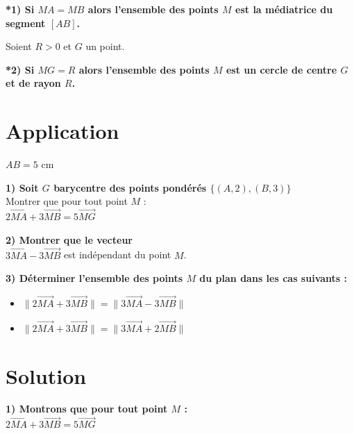 \documentclass{article}
\begin{document}
\noindent \textbf{*1) Si $MA = MB$ alors l'ensemble des points $M$ est la médiatrice du segment $[AB]$.}

\vspace{1.5em}

\noindent Soient $R > 0$ et $G$ un point.

\vspace{1em}

\noindent \textbf{*2) Si $MG = R$ alors l'ensemble des points $M$ est un cercle de centre $G$ et de rayon $R$.}

\section*{Application}

\noindent $AB = 5\text{ cm}$

\vspace{1em}

\noindent \textbf{1) Soit $G$ barycentre des points pondérés $\{(A, 2), (B, 3)\}$} \\
Montrer que pour tout point $M$ : \\
$2 \overrightarrow{MA} + 3 \overrightarrow{MB} = 5 \overrightarrow{MG}$

\vspace{1.5em}

\noindent \textbf{2) Montrer que le vecteur} \\
$3 \overrightarrow{MA} - 3 \overrightarrow{MB}$ est indépendant du point $M$.

\vspace{1.5em}

\noindent \textbf{3) Déterminer l'ensemble des points $M$ du plan dans les cas suivants :}

\vspace{1em}

\begin{itemize}
    \item[a)] $\| 2 \overrightarrow{MA} + 3 \overrightarrow{MB} \| = \| 3 \overrightarrow{MA} - 3 \overrightarrow{MB} \|$
    \item[b)] $\| 2 \overrightarrow{MA} + 3 \overrightarrow{MB} \| = \| 3 \overrightarrow{MA} + 2 \overrightarrow{MB} \|$
\end{itemize}

\section*{Solution}

\noindent \textbf{1) Montrons que pour tout point $M$ :} \\
$2 \overrightarrow{MA} + 3 \overrightarrow{MB} = 5 \overrightarrow{MG}$
\end{document}
